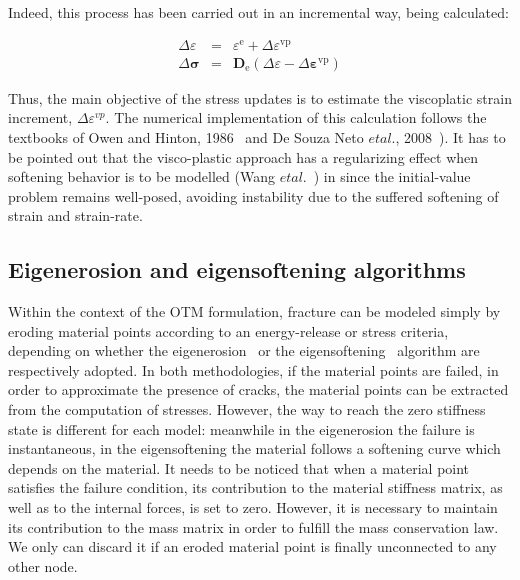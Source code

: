 \documentclass[applsci,journal,article,submit,moreauthors,pdftex]{Definitions/mdpi}
\begin{document}
Indeed, this process has been carried out in an incremental way, being calculated:

\begin{eqnarray}
\Delta \varepsilon &=& \varepsilon^{\mathrm{e}}+\Delta \varepsilon^{\mathrm{vp}} \\
\Delta \boldsymbol{\sigma} &=& \mathbf{D}_{\mathrm{e}}\left(\Delta \varepsilon-\Delta \boldsymbol{\varepsilon}^{\mathrm{vp}}\right)
\end{eqnarray}


Thus, the main objective of the stress updates is to estimate the viscoplatic strain increment, $\Delta \varepsilon^{v p}.$ The numerical implementation of this calculation follows the textbooks of Owen and Hinton, 1986~\cite{Owen1981} and De Souza Neto $et al.$, 2008~\cite{DPOwen2005}). It has to be pointed out that the visco-plastic approach has a regularizing effect when softening behavior is to be modelled (Wang $et al.$~\cite{Wang:1997}) in since the initial-value problem remains well-posed, avoiding instability due to the suffered softening of strain and strain-rate.


\subsection{Eigenerosion and eigensoftening algorithms}

Within the context of the OTM formulation, fracture can be modeled simply by eroding material points according to an energy-release or stress criteria, depending on whether the eigenerosion~\cite{schmidt09, Pandolfi_12, Li_12, Pandolfi_13} or the eigensoftening~\cite{Navas2018a,Yu2018,Molinos2020b} algorithm are respectively adopted. In both methodologies, if the material points are failed, in order to approximate the presence of cracks, the material points can be extracted from the computation of stresses. However, the way to reach the zero stiffness state is different for each model: meanwhile in the eigenerosion the failure is instantaneous, in the eigensoftening the material follows a softening curve which depends on the material. It needs to be noticed that when a material point satisfies the failure condition, its contribution to the material stiffness matrix, as well as to the internal forces, is set to zero. However, it is necessary to maintain its contribution to the mass matrix in order to fulfill the mass conservation law.  We only can discard it if an eroded material point is finally unconnected to any other node.
\end{document}
